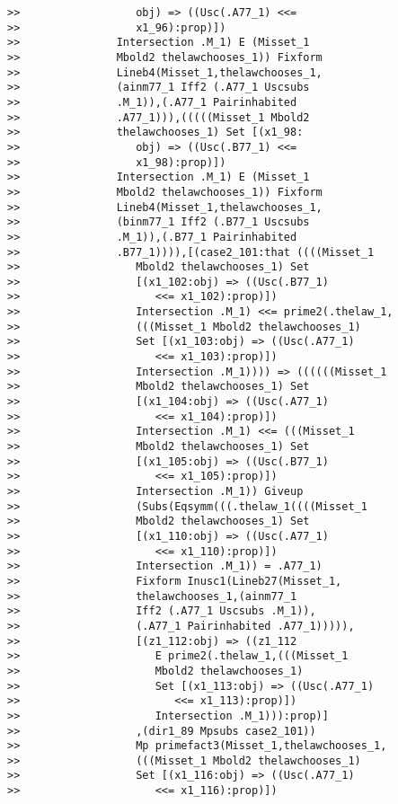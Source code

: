\documentclass[12pt]{article}
\begin{document}
\begin{verbatim}
>>                  obj) => ((Usc(.A77_1) <<=
>>                  x1_96):prop)])
>>               Intersection .M_1) E (Misset_1
>>               Mbold2 thelawchooses_1)) Fixform
>>               Lineb4(Misset_1,thelawchooses_1,
>>               (ainm77_1 Iff2 (.A77_1 Uscsubs
>>               .M_1)),(.A77_1 Pairinhabited
>>               .A77_1))),(((((Misset_1 Mbold2
>>               thelawchooses_1) Set [(x1_98:
>>                  obj) => ((Usc(.B77_1) <<=
>>                  x1_98):prop)])
>>               Intersection .M_1) E (Misset_1
>>               Mbold2 thelawchooses_1)) Fixform
>>               Lineb4(Misset_1,thelawchooses_1,
>>               (binm77_1 Iff2 (.B77_1 Uscsubs
>>               .M_1)),(.B77_1 Pairinhabited
>>               .B77_1)))),[(case2_101:that ((((Misset_1
>>                  Mbold2 thelawchooses_1) Set
>>                  [(x1_102:obj) => ((Usc(.B77_1)
>>                     <<= x1_102):prop)])
>>                  Intersection .M_1) <<= prime2(.thelaw_1,
>>                  (((Misset_1 Mbold2 thelawchooses_1)
>>                  Set [(x1_103:obj) => ((Usc(.A77_1)
>>                     <<= x1_103):prop)])
>>                  Intersection .M_1)))) => ((((((Misset_1
>>                  Mbold2 thelawchooses_1) Set
>>                  [(x1_104:obj) => ((Usc(.A77_1)
>>                     <<= x1_104):prop)])
>>                  Intersection .M_1) <<= (((Misset_1
>>                  Mbold2 thelawchooses_1) Set
>>                  [(x1_105:obj) => ((Usc(.B77_1)
>>                     <<= x1_105):prop)])
>>                  Intersection .M_1)) Giveup
>>                  (Subs(Eqsymm(((.thelaw_1((((Misset_1
>>                  Mbold2 thelawchooses_1) Set
>>                  [(x1_110:obj) => ((Usc(.A77_1)
>>                     <<= x1_110):prop)])
>>                  Intersection .M_1)) = .A77_1)
>>                  Fixform Inusc1(Lineb27(Misset_1,
>>                  thelawchooses_1,(ainm77_1
>>                  Iff2 (.A77_1 Uscsubs .M_1)),
>>                  (.A77_1 Pairinhabited .A77_1))))),
>>                  [(z1_112:obj) => ((z1_112
>>                     E prime2(.thelaw_1,(((Misset_1
>>                     Mbold2 thelawchooses_1)
>>                     Set [(x1_113:obj) => ((Usc(.A77_1)
>>                        <<= x1_113):prop)])
>>                     Intersection .M_1))):prop)]
>>                  ,(dir1_89 Mpsubs case2_101))
>>                  Mp primefact3(Misset_1,thelawchooses_1,
>>                  (((Misset_1 Mbold2 thelawchooses_1)
>>                  Set [(x1_116:obj) => ((Usc(.A77_1)
>>                     <<= x1_116):prop)])

\end{verbatim}
\end{document}
